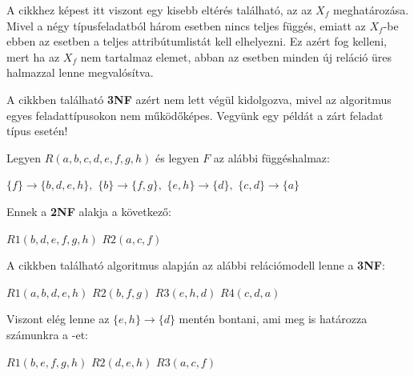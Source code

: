 A cikkhez képest itt viszont egy kisebb eltérés található, az az $X_f$ meghatározása. Mivel a négy típusfeladatból három esetben nincs teljes függés, emiatt az $X_f$-be ebben az esetben a teljes attribútumlistát kell elhelyezni. Ez azért fog kelleni, mert ha az $X_f$ nem tartalmaz elemet, abban az esetben minden új reláció üres halmazzal lenne megvalósítva. \par

A cikkben található \textbf{3NF} azért nem lett végül kidolgozva, mivel az algoritmus egyes feladattípusokon nem működőképes. Vegyünk egy példát a zárt feladat típus esetén!

\begin{pld}
Legyen $R(a,b,c,d,e,f,g,h)$ és legyen $F$ az alábbi függéshalmaz:
\begin{center}
    $\{f\} \longrightarrow \{b,d,e,h\},$\break
    $\{b\} \longrightarrow \{f,g\},$\break
    $\{e,h\} \longrightarrow \{d\},$\break
    $\{c,d\} \longrightarrow \{a\}$
\end{center}
Ennek a \textbf{2NF} alakja a következő:
\begin{center}
    $R1(b,d,e,f,g,h)$ \break
    $R2(a,c,f)$
\end{center}
A cikkben található algoritmus alapján az alábbi relációmodell lenne a \textbf{3NF}:
\begin{center}
    $R1(a,b,d,e,h)$ \break
    $R2(b,f,g)$ \break
    $R3(e,h,d)$ \break
    $R4(c,d,a)$
\end{center}
Viszont elég lenne az $\{e,h\} \longrightarrow \{d\}$ mentén bontani, ami meg is határozza számunkra a \nfh-et:
\begin{center}
    $R1(b,e,f,g,h)$ \break
    $R2(d,e,h)$
    $R3(a,c,f)$
\end{center}
\end{pld}

%
